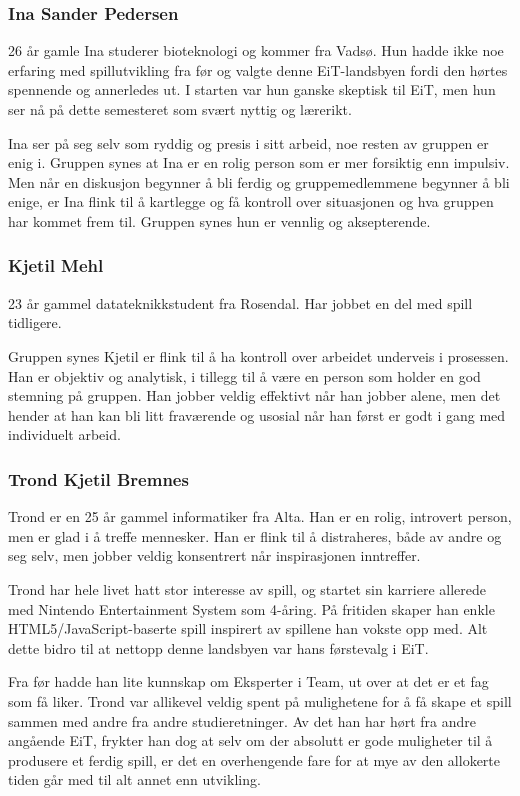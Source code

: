 	\subsubsection{Ina Sander Pedersen}
	26 år gamle Ina studerer bioteknologi og kommer fra Vadsø. Hun hadde ikke noe erfaring med spillutvikling fra før og valgte denne EiT-landsbyen fordi den hørtes spennende og annerledes ut. I starten var hun ganske skeptisk til EiT, men hun ser nå på dette semesteret som svært nyttig og lærerikt.

	Ina ser på seg selv som ryddig og presis i sitt arbeid, noe resten av gruppen er enig i. Gruppen synes at Ina er en rolig person som er mer forsiktig enn impulsiv. Men når en diskusjon begynner å bli ferdig og gruppemedlemmene begynner å bli enige, er Ina flink til å kartlegge og få kontroll over situasjonen og hva gruppen har kommet frem til. Gruppen synes hun er vennlig og aksepterende.

	\subsubsection{Kjetil Mehl}
	23 år gammel datateknikkstudent fra Rosendal. Har jobbet en del med spill tidligere.

	Gruppen synes Kjetil er flink til å ha kontroll over arbeidet underveis i prosessen. Han er objektiv og analytisk, i tillegg til å være en person som holder en god stemning på gruppen. Han jobber veldig effektivt når han jobber alene, men det hender at han kan bli litt fraværende og usosial når han først er godt i gang med individuelt arbeid.


	\subsubsection{Trond Kjetil Bremnes}
	Trond er en 25 år gammel informatiker fra Alta. Han er en rolig, introvert person, men er glad i å treffe mennesker. Han er flink til å distraheres, både av andre og seg selv, men jobber veldig konsentrert når inspirasjonen inntreffer.

	Trond har hele livet hatt stor interesse av spill, og startet sin karriere allerede med Nintendo Entertainment System som 4-åring. På fritiden skaper han enkle HTML5/JavaScript-baserte spill inspirert av spillene han vokste opp med. Alt dette bidro til at nettopp denne landsbyen var hans førstevalg i EiT.

	Fra før hadde han lite kunnskap om Eksperter i Team, ut over at det er et fag som få liker. Trond var allikevel veldig spent på mulighetene for å få skape et spill sammen med andre fra andre studieretninger. Av det han har hørt fra andre angående EiT, frykter han dog at selv om der absolutt er gode muligheter til å produsere et ferdig spill, er det en overhengende fare for at mye av den allokerte tiden går med til alt annet enn utvikling.


